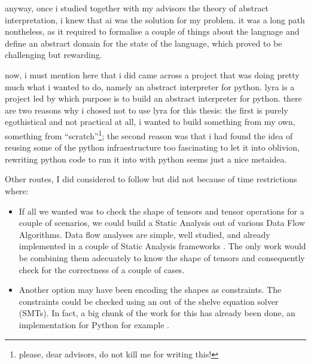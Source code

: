 anyway, once i studied together with my advisors the theory of abstract
interpretation, i knew that ai was the solution for my problem. it was a
long path nontheless, as it required to formalise a couple of things
about the language and define an abstract domain for the state of the
language, which proved to be challenging but rewarding.

now, i must mention here that i did came across a project that was doing
pretty much what i wanted to do, namely an abstract interpreter for
python. {} lyra is a project led by {} which purpose is to build an abstract interpreter for python. there
are two reasons why i chosed not to use lyra for this thesis: the first
is purely egothistical and not practical at all, i wanted to build
something from my own, something from \enquote{scratch}\footnote{please,
  dear advisors, do not kill me for writing this!}; the second reason
was that i had found the idea of reusing some of the python
infraestructure too fascinating to let it into oblivion, rewriting
python code to run it into with python seems just a nice metaidea.

{}

Other routes, I did considered to follow but did not because of time
restrictions where:

\begin{itemize}
\tightlist
\item
  If all we wanted was to check the shape of tensors and tensor
  operations for a couple of scenarios, we could build a Static Analysis
  out of various Data Flow Algorithms. Data flow analyses are simple,
  well studied, and already implemented in a couple of Static Analysis
  frameworks {}. The only work would be combining them adecuately to know the
  shape of tensors and consequently check for the correctness of a
  couple of cases.
\item
  Another option may have been encoding the shapes as constraints. The
  constraints could be checked using an out of the shelve equation
  solver (SMTs). In fact, a big chunk of the work for this has already
  been done, an implementation for Python for example {}.
\end{itemize}
